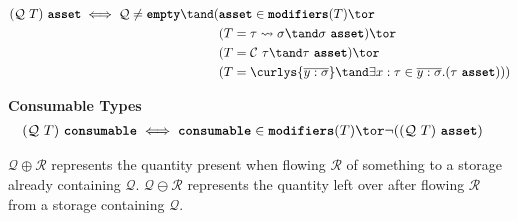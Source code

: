 \documentclass[dvipsnames, usenames, sigconf]{acmart}
\begin{document}
\begin{align*}
    (\mathcal{Q}~T)~\asset \iff \mathcal{Q} \neq \emptyq \tand (& \asset \in \modifiers(T) \tor \\
                                                                & (T = \tau \transforms \sigma \tand \sigma~\asset) \tor \\
                                                                & (T = \mathcal{C}~\tau \tand \tau~\asset) \tor \\
                                                                & (T = \curlys{\overline{y : \sigma}} \tand \exists x : \tau \in \overline{y : \sigma}. (\tau~\asset)))
\end{align*}

\framebox{$\tau~\consumable$} \textbf{Consumable Types}
\begin{align*}
    (\mathcal{Q}~T)~\consumable &\iff \consumable \in \modifiers(T) \tor \lnot((\mathcal{Q}~T)~\asset)
\end{align*}

$\mathcal{Q} \oplus \mathcal{R}$ represents the quantity present when flowing $\mathcal{R}$ of something to a storage already containing $\mathcal{Q}$.
$\mathcal{Q} \ominus \mathcal{R}$ represents the quantity left over after flowing $\mathcal{R}$ from a storage containing $\mathcal{Q}$.
\end{document}
